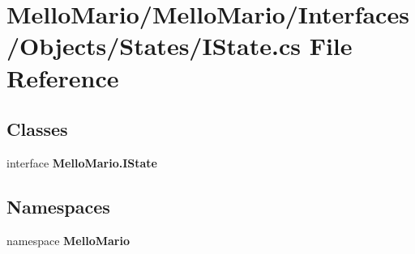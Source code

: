 \section{Mello\+Mario/\+Mello\+Mario/\+Interfaces/\+Objects/\+States/\+I\+State.cs File Reference}
\label{IState_8cs}
\subsection*{Classes}
\begin{DoxyCompactItemize}
\item 
interface \textbf{ Mello\+Mario.\+I\+State}
\end{DoxyCompactItemize}
\subsection*{Namespaces}
\begin{DoxyCompactItemize}
\item 
namespace \textbf{ Mello\+Mario}
\end{DoxyCompactItemize}
